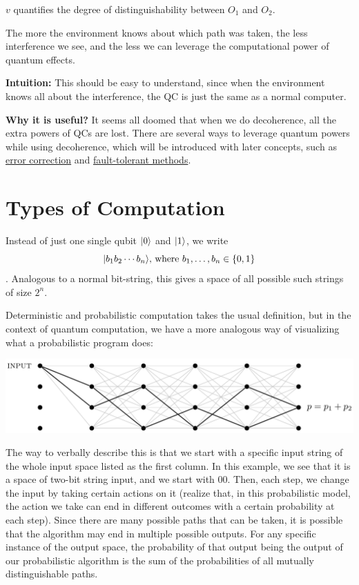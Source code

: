 \documentclass[12pt]{article}
\begin{document}
\begin{proposition}
$v$ quantifies the degree of distinguishability between $O_1$ and $O_2$.
\end{proposition}

\begin{proposition}
The more the environment knows about which path was taken, the less interference we see, and the less we can leverage the computational power of quantum effects.
\end{proposition}
\textbf{Intuition:} This should be easy to understand, since when the environment knows all about the interference, the QC is just the same as a normal computer.

\textbf{Why it is useful?} It seems all doomed that when we do decoherence, all the extra powers of QCs are lost. There are several ways to leverage quantum powers while using decoherence, which will be introduced with later concepts, such as \underline{error correction} and \underline{fault-tolerant methods}.

\section{Types of Computation}
\begin{definition}
Instead of just one single qubit $\Ket{0}$ and $\Ket{1}$, we write $$
\Ket{b_1b_2\cdots b_n}\text{, where }b_1, \ldots, b_n\in \{0,1\}
$$. Analogous to a normal bit-string, this gives a space of all possible such strings of size $2^n$.
\end{definition}

\begin{intuition}\label{int:prob-comp}
Deterministic and probabilistic computation takes the usual definition, but in the context of quantum computation, we have a more analogous way of visualizing what a probabilistic program does:
\begin{center}
    \includegraphics[width = 40em]{images/6.jpg}
\end{center}

The way to verbally describe this is that we start with a specific input string of the whole input space listed as the first column. In this example, we see that it is a space of two-bit string input, and we start with $00$. Then, each step, we change the input by taking certain actions on it (realize that, in this probabilistic model, the action we take can end in different outcomes with a certain probability at each step). Since there are many possible paths that can be taken, it is possible that the algorithm may end in multiple possible outputs. For any specific instance of the output space, the probability of that output being the output of our probabilistic algorithm is the sum of the probabilities of all mutually distinguishable paths.
\end{intuition}
\end{document}

